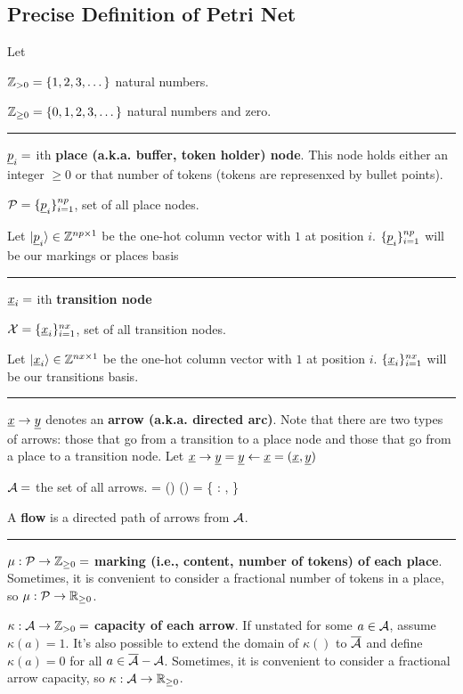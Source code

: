 \subsection{Precise Definition of Petri Net}
Let

${\mathbb{Z}}_{>0}= \{1, 2, 3, \dots\}$ natural numbers.

${\mathbb{Z}}_{\geq 0}= \{0, 1, 2, 3, \dots\}$ natural numbers and zero.

\hrule
$\rvp_i =$ ith {\bf place  (a.k.a. buffer, token holder) node}. This node holds either
an integer $\geq 0$ or that number of tokens (tokens are represenxed by bullet points).

$\calp = \{\rvp_i\}_{i=1}^{np}$, set of all place nodes.


Let $\ket{\rvp_i}\in \ZZ^{np\times 1}$ be the one-hot 
column vector with
$1$ at position $i$. $\{\rvp_i\}_{i=1}^{np}$ will be our {markings or places basis}

\hrule 

$\rvx_i =$ ith {\bf transition node}



$\calx = \{\rvx_i\}_{i=1}^{nx}$, set of all transition nodes.

Let $\ket{\rvx_i}\in \ZZ^{nx\times 1}$ be the one-hot 
column vector with
$1$ at position $i$. $\{\rvx_i\}_{i=1}^{nx}$ will be our {transitions basis}.

\hrule

$\rvx\rarrow \rvy$ denotes an {\bf arrow (a.k.a. directed arc)}. Note that there are two types of arrows:
those that go from a transition to a place node and those that go from a place to
a transition node. Let $\rvx\rarrow\rvy=\rvy\larrow \rvx = (\rvx,\rvy)$

${\cal A} =$  the set of all arrows.
 \beq\cala \subset \ol {\cala} = (\calp \times \calx) \cup (\calx \times \calp) = \{\calp\rarrow\calx {} \calx \rarrow \calp:
\rvp\in\calp, \rvx \in \calx\}\eeq


A {\bf flow} is a directed path of arrows from ${\cal A}$.

\hrule
$\mu : {\cal P} \rightarrow {\mathbb{Z}}_{\geq 0}=$ {\bf marking (i.e., content,
number of tokens) of  each place}. Sometimes, it is convenient to consider a fractional number of tokens in a place, so
$\mu : {\cal P} \rightarrow { \mathbb{R}}_{\geq 0}$.



$\kappa : {\cal A}\rightarrow {\mathbb{Z}}_{>0}=$ {\bf capacity of each arrow}. If unstated for some $a\in {\cal A}$, assume $\kappa(a) = 1$. It's also possible to extend the domain of 
$\kappa()$ to $\overline{{\cal A}}$ and define $\kappa(a) = 0$
for all $a\in \overline{{\cal A}}-{\cal A}$. Sometimes, it is convenient to consider a fractional arrow capacity, so
$\kappa : {\cal A} \rightarrow { \mathbb{R}}_{\geq 0}$.

